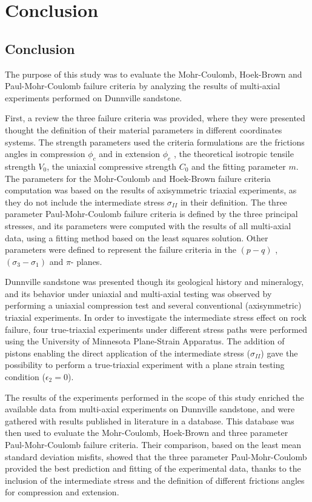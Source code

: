 \chapter{Conclusion}\label{ch6:chapter6}
\section{Conclusion}

The purpose of this study was to evaluate the Mohr-Coulomb, Hoek-Brown and Paul-Mohr-Coulomb failure criteria by analyzing the results of multi-axial experiments performed on Dunnville sandstone. 

First, a review the three failure criteria was provided, where they were presented thought the definition of their material parameters in different coordinates systems. The strength parameters used the criteria formulations are the frictions angles in compression $\phi_c$ and in extension $\phi_e$ , the theoretical isotropic tensile strength $V_0$, the uniaxial compressive strength $C_0$ and the fitting parameter $m$. The parameters for the Mohr-Coulomb and Hoek-Brown failure criteria computation was based on the results of axisymmetric triaxial experiments, as they do not include the intermediate stress $\sigma_{II}$ in their definition. The three parameter Paul-Mohr-Coulomb failure criteria is defined by the three principal stresses, and its parameters were computed with the results of all multi-axial data, using a fitting method based on the least squares solution.  Other parameters were defined to represent the failure criteria in the $(p-q)$ , $(\sigma_3-\sigma_1)$ and $\pi$- planes.

Dunnville sandstone was presented though its geological history and mineralogy, and its behavior under uniaxial and multi-axial testing was observed by performing a uniaxial compression test and several conventional (axisymmetric) triaxial experiments. In order to investigate the intermediate stress effect on rock failure, four true-triaxial experiments under different stress paths were performed using the University of Minnesota Plane-Strain Apparatus. The addition of pistons enabling the direct application of the intermediate stress ($\sigma_{II}$) gave the possibility to perform a true-triaxial experiment with a plane strain testing condition ($\epsilon_2=0$). 

The results of the experiments performed in the scope of this study enriched the available data from multi-axial experiments on Dunnville sandstone, and were gathered with results published in literature in a database. This database was then used to evaluate the Mohr-Coulomb, Hoek-Brown and three parameter Paul-Mohr-Coulomb failure criteria. Their comparison, based on the least mean standard deviation misfits, showed that the three parameter Paul-Mohr-Coulomb provided the best prediction and fitting of the experimental data, thanks to the inclusion of the intermediate stress and the definition of different frictions angles for compression and extension. 

